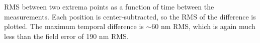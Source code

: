 RMS between two extrema points as a function of time between the measurements. Each position is center-subtracted, so the RMS of the difference is plotted. The maximum temporal difference is $\sim$60 nm RMS, which is again much less than the field error of 190 nm RMS.
\label{fig:inst_time_var_pairs}
  